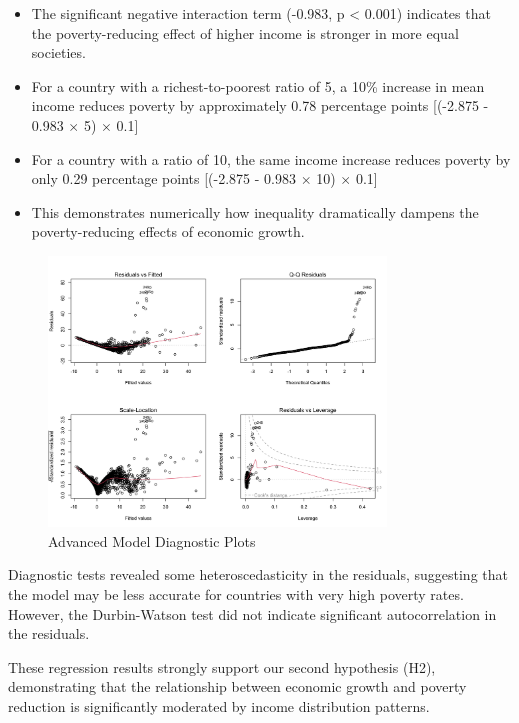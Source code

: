 \documentclass[12pt,a4paper]{article}
\begin{document}
\begin{enumerate}
\begin{itemize}
        \item The significant negative interaction term (-0.983, p < 0.001) indicates that the poverty-reducing effect of higher income is stronger in more equal societies.
        \item For a country with a richest-to-poorest ratio of 5, a 10\% increase in mean income reduces poverty by approximately 0.78 percentage points [(-2.875 - 0.983 $\times$ 5) $\times$ 0.1]
        \item For a country with a ratio of 10, the same income increase reduces poverty by only 0.29 percentage points [(-2.875 - 0.983 $\times$ 10) $\times$ 0.1]
        \item This demonstrates numerically how inequality dramatically dampens the poverty-reducing effects of economic growth.
    \end{itemize}
\end{enumerate}

\begin{figure}[h]
\centering
\includegraphics[width=0.8\textwidth]{../output/visualizations/advanced_model_diagnostics.png}
\caption{Advanced Model Diagnostic Plots}
\end{figure}

Diagnostic tests revealed some heteroscedasticity in the residuals, suggesting that the model may be less accurate for countries with very high poverty rates. However, the Durbin-Watson test did not indicate significant autocorrelation in the residuals.

These regression results strongly support our second hypothesis (H2), demonstrating that the relationship between economic growth and poverty reduction is significantly moderated by income distribution patterns.
\end{document}
